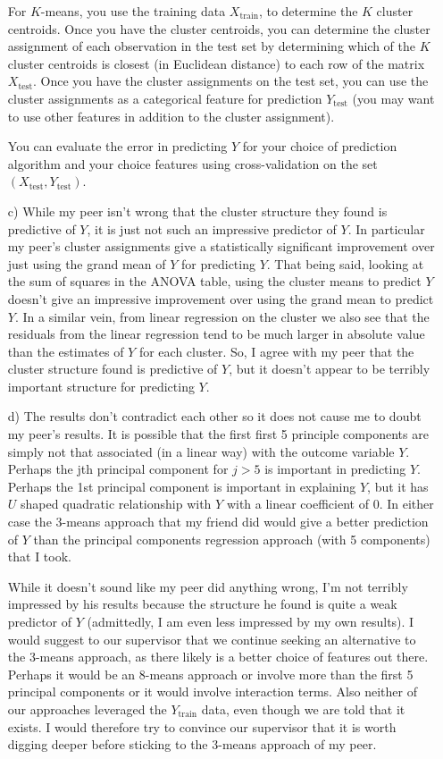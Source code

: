 \begin{enumerate}
For $K$-means, you use the training data $X_{\text{train}}$, to determine the $K$ cluster centroids. Once you have the cluster centroids, you can determine the cluster assignment of each observation in the test set by determining which of the $K$ cluster centroids is closest (in Euclidean distance) to each row of the matrix $X_{\text{test}}$. Once you have the cluster assignments on the test set, you can use the cluster assignments as a categorical feature for prediction $Y_{\text{test}}$ (you may want to use other features in addition to the cluster assignment). 


You can evaluate the error in predicting $Y$ for your choice of prediction algorithm and your choice features using cross-validation on the set $(X_{\text{test}}, Y_{\text{test}})$.


\item[c)] While my peer isn't wrong that the cluster structure they found is predictive of $Y$, it is just not such an impressive predictor of $Y$. In particular my peer's cluster assignments give a statistically significant improvement over just using the grand mean of $Y$ for predicting $Y$. That being said, looking at the sum of squares in the ANOVA table, using the cluster means to predict $Y$ doesn't give an impressive improvement over using the grand mean to predict $Y$. In a similar vein, from linear regression on the cluster we also see that the residuals from the linear regression tend to be much larger in absolute value than the estimates of $Y$ for each cluster. So, I agree with my peer that the cluster structure found is predictive of $Y$, but it doesn't appear to be terribly important structure for predicting $Y$.

\item[d)] The results don't contradict each other so it does not cause me to doubt my peer's results. It is possible that the first first 5 principle components are simply not that associated (in a linear way) with the outcome variable $Y$. Perhaps the jth principal component for $j>5$ is important in predicting $Y$. Perhaps the 1st principal component is important in explaining $Y$, but it has $U$ shaped quadratic relationship with $Y$ with a linear coefficient of $0$. In either case the 3-means approach that my friend did would give a better prediction of $Y$ than the principal components regression approach (with 5 components) that I took.

While it doesn't sound like my peer did anything wrong, I'm not terribly impressed by his results because the structure he found is quite a weak predictor of $Y$ (admittedly, I am even less impressed by my own results). I would suggest to our supervisor that we continue seeking an alternative to the 3-means approach, as there likely is a better choice of features out there. Perhaps it would be an 8-means approach or involve more than the first 5 principal components or it would involve interaction terms. Also neither of our approaches leveraged the $Y_{\text{train}}$ data, even though we are told that it exists. I would therefore try to convince our supervisor that it is worth digging deeper before sticking to the 3-means approach of my peer.
\end{enumerate}



